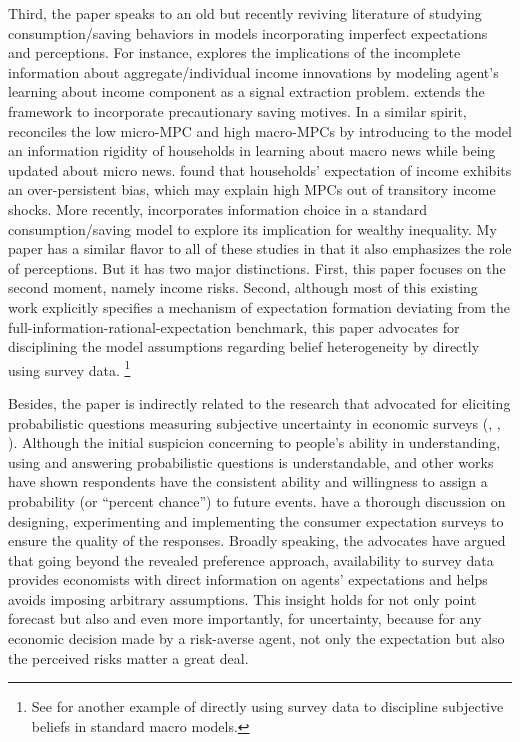 Third, the paper
speaks to an old but recently reviving literature of studying
consumption/saving behaviors in models incorporating imperfect
expectations and perceptions. For instance, \cite{pischke1995individual} explores the implications of the
incomplete information about aggregate/individual income innovations by modeling agent's learning about income component as a signal extraction problem. \cite{wang2004precautionary} extends the framework to incorporate precautionary saving motives. In a similar spirit, \cite{carroll_sticky_2018} reconciles the low micro-MPC and high macro-MPCs by introducing to the model an information rigidity of households in learning about macro news while being updated about micro news. \cite{rozsypal_overpersistence_2017} found that households' expectation of income exhibits an over-persistent bias, which may explain high MPCs out of transitory income shocks. More recently, \cite{broer2021information} incorporates information choice in a standard consumption/saving model to explore its implication for wealthy inequality. My paper has a similar flavor to all of these studies in that it also emphasizes the role of perceptions. But it has two major distinctions. First, this paper focuses on the second moment, namely income risks. Second, although most of this existing work explicitly specifies a mechanism of expectation formation deviating from the full-information-rational-expectation benchmark, this paper advocates for disciplining the model assumptions regarding belief heterogeneity by directly using survey data. \footnote{See \cite{bhandari2019survey} for another example of directly using survey data to discipline subjective beliefs in standard macro models.}

Besides, the paper is indirectly related to the research that advocated
for eliciting probabilistic questions measuring subjective uncertainty
in economic surveys (\cite{manski_measuring_2004},
\cite{delavande2011measuring}, \cite{manski_survey_2018}). Although the
initial suspicion concerning to people's ability in understanding, using
and answering probabilistic questions is understandable,
\cite{bertrand_people_2001} and other works have shown respondents have
the consistent ability and willingness to assign a probability (or
``percent chance'') to future events. \cite{armantier_overview_2017}
have a thorough discussion on designing, experimenting and implementing
the consumer expectation surveys to ensure the quality of the responses.
Broadly speaking, the advocates have argued that going beyond the
revealed preference approach, availability to survey data provides
economists with direct information on agents' expectations and helps
avoids imposing arbitrary assumptions. This insight holds for not only
point forecast but also and even more importantly, for uncertainty,
because for any economic decision made by a risk-averse agent, not only
the expectation but also the perceived risks matter a great deal.


